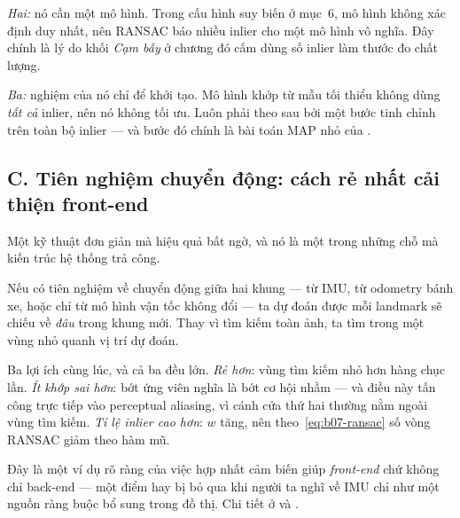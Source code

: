 \documentclass[../../vslam.tex]{subfiles}
\begin{document}
\emph{Hai:} nó cần một mô hình. Trong cấu hình suy biến ở  mục~6, mô hình không xác định duy nhất, nên RANSAC báo nhiều inlier cho một mô hình vô nghĩa. Đây chính là lý do khối \emph{Cạm bẫy} ở chương đó cấm dùng số inlier làm thước đo chất lượng.

\emph{Ba:} nghiệm của nó chỉ để khởi tạo. Mô hình khớp từ mẫu tối thiểu không dùng \emph{tất cả} inlier, nên nó không tối ưu. Luôn phải theo sau bởi một bước tinh chỉnh trên toàn bộ inlier --- và bước đó chính là bài toán MAP nhỏ của .

\subsection{C. Tiên nghiệm chuyển động: cách rẻ nhất cải thiện front-end}

Một kỹ thuật đơn giản mà hiệu quả bất ngờ, và nó là một trong những chỗ mà kiến trúc hệ thống trả công.

Nếu có tiên nghiệm về chuyển động giữa hai khung --- từ IMU, từ odometry bánh xe, hoặc chỉ từ mô hình vận tốc không đổi --- ta dự đoán được mỗi landmark sẽ chiếu về \emph{đâu} trong khung mới. Thay vì tìm kiếm toàn ảnh, ta tìm trong một vùng nhỏ quanh vị trí dự đoán.

Ba lợi ích cùng lúc, và cả ba đều lớn. \emph{Rẻ hơn}: vùng tìm kiếm nhỏ hơn hàng chục lần. \emph{Ít khớp sai hơn}: bớt ứng viên nghĩa là bớt cơ hội nhầm --- và điều này tấn công trực tiếp vào perceptual aliasing, vì cánh cửa thứ hai thường nằm ngoài vùng tìm kiếm. \emph{Tỉ lệ inlier cao hơn}: \(w\) tăng, nên theo~\eqref{eq:b07-ransac} số vòng RANSAC giảm theo hàm mũ.

Đây là một ví dụ rõ ràng của việc hợp nhất cảm biến giúp \emph{front-end} chứ không chỉ back-end --- một điểm hay bị bỏ qua khi người ta nghĩ về IMU chỉ như một nguồn ràng buộc bổ sung trong đồ thị. Chi tiết ở  và .

\begin{ungdung}
\end{ungdung}
\end{document}
